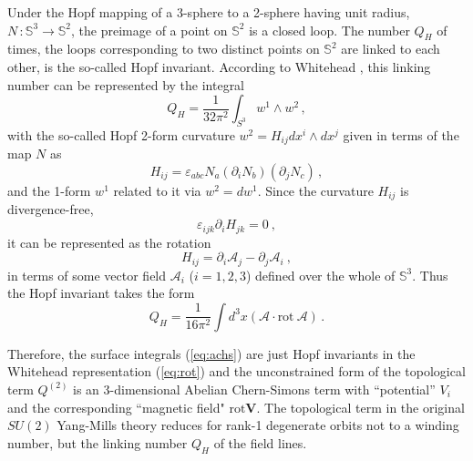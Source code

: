 \documentclass[a4paper,12pt]{article}
\begin{document}
Under the Hopf mapping of a 3-sphere to a 2-sphere having unit radius,
$N\, : \mathbb{S}^3 \to \mathbb{S}^2$, the preimage of a point on
$\mathbb{S}^2$ is a closed loop.
The number $Q_H$ of times, the loops corresponding to two distinct points
on $\mathbb{S}^2$ are linked to each other, is the so-called Hopf invariant.
According to Whitehead \cite{Whitehead}, this linking number can be
represented by the integral
\begin{equation} \label{eq:Hopf}
Q_H = \frac{1}{32\pi^2}\int_{S^3}  w^1 \wedge w^2\,,
\end{equation}
with the so-called Hopf 2-form curvature  $w^2 = H_{ij} dx^i  \wedge dx^j $
given in terms of the map $N$ as
\begin{equation}
\label{Hij1}
H_{ij}  = \varepsilon_{abc}N_a
\left( \partial_i N_b\right) \left(\partial_j N_c \right)\,,
\end{equation}
and the 1-form $w^1$ related to it via $w^2 =dw^1$.
Since the curvature $H_{ij}$ is divergence-free,
\begin{equation}
\varepsilon_{ijk}\partial_{i}H_{jk}=0~,
\end{equation}
it can be represented as the rotation
\begin{equation}
\label{Hij2}
H_{ij} =\partial_i \mathcal{A}_j - \partial_j\mathcal{A}_i~,
\end{equation}
in terms of some vector field $\mathcal{A}_i$ ($i=1,2,3$)
defined over the whole of $\mathbb{S}^3$.
Thus the Hopf invariant takes the form
\begin{equation}
\label{eq:rot}
Q_{H} = \frac{1}{16\pi^2}\int d^3x
\left( {\mathbf{\mathcal{A}}}\cdot \mbox{rot}\
{\mathbf{\mathcal{A}}} \right)\,.
\end{equation}

Therefore, the surface integrals (\ref{eq:achs}) are just Hopf invariants
in the Whitehead representation (\ref{eq:rot})
and the unconstrained form of the topological term $Q^{(2)}$
is an 3-dimensional Abelian Chern-Simons term \cite{Jackiw}
with ``potential'' $V_i\ $ and the corresponding ``magnetic
field" $ \mbox{rot}\mathbf{V}$.
The topological term in the original $SU(2)$ Yang-Mills theory
reduces for rank-1 degenerate orbits not to a winding number,
but the linking number $Q_H$ of the field lines.
\end{document}
